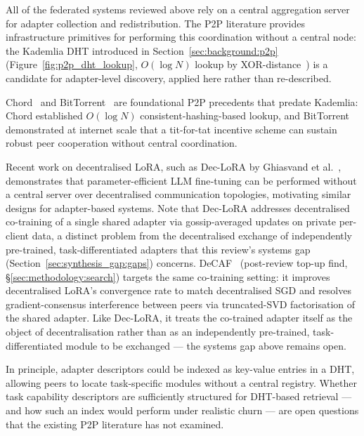 All of the federated systems reviewed above rely on a central aggregation server for
adapter collection and redistribution. The P2P literature provides infrastructure
primitives for performing this coordination without a central node: the Kademlia DHT
introduced in Section~\ref{sec:background:p2p} (Figure~\ref{fig:p2p_dht_lookup},
$O(\log N)$ lookup by XOR-distance~\cite{MaymounkovKademlia2002}) is a candidate for
adapter-level discovery, applied here rather than re-described.

Chord~\cite{StoicaChord2001} and BitTorrent~\cite{CohenBitTorrent2003} are foundational P2P precedents that predate Kademlia: Chord established $O(\log N)$ consistent-hashing-based lookup, and BitTorrent demonstrated at internet scale that a tit-for-tat incentive scheme can sustain robust peer cooperation without central coordination.

Recent work on decentralised LoRA, such as Dec-LoRA by Ghiasvand et al.~\cite{Ghiasvand2025}, demonstrates that parameter-efficient LLM fine‑tuning can be performed without a central server over decentralised communication topologies, motivating similar designs for adapter-based systems. Note that Dec-LoRA addresses decentralised co-training of a single shared adapter via gossip-averaged updates on private per-client data, a distinct problem from the decentralised exchange of independently pre-trained, task-differentiated adapters that this review's systems gap (Section~\ref{sec:synthesis_gap:gaps}) concerns. DeCAF~\cite{SaadatiDeCAF2026} (post-review top-up find, \S\ref{sec:methodology:search}) targets the same co-training setting: it improves decentralised LoRA's convergence rate to match decentralised SGD and resolves gradient-consensus interference between peers via truncated-SVD factorisation of the shared adapter. Like Dec-LoRA, it treats the co-trained adapter itself as the object of decentralisation rather than as an independently pre-trained, task-differentiated module to be exchanged — the systems gap above remains open.

In principle, adapter descriptors could be indexed as key-value entries in a DHT, allowing peers to locate task-specific modules without a central registry. Whether task capability descriptors are sufficiently structured for DHT-based retrieval — and how such an index would perform under realistic churn — are open questions that the existing P2P literature has not examined.
